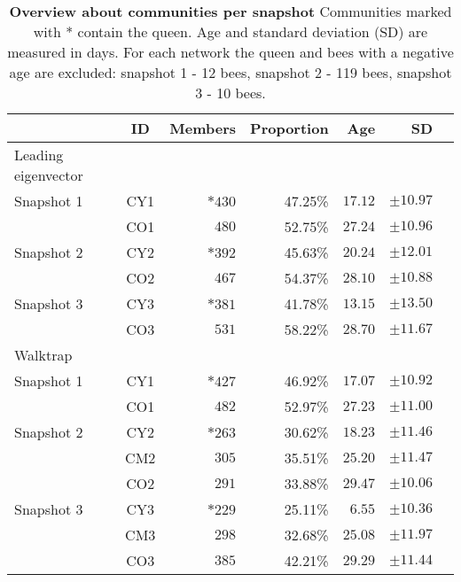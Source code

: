 \begin{table}
\small
\centering
\caption[Overview about communities]{\textbf{Overview about communities per snapshot} Communities marked with * contain the queen. Age and standard deviation (SD) are measured in days. For each network the queen and bees with a negative age are excluded: snapshot 1 - 12 bees, snapshot 2 - 119 bees, snapshot 3 - 10 bees.}
\label{tab:communities}
\vspace*{5mm}
\begin{tabular}{lcrrrrr}
	\toprule
	{}  & ID & Members & Proportion & Age & SD\\
	\midrule

	Leading eigenvector &&&&&\\
	\midrule 
	\quad Snapshot 1  & CY1 & $*430$  & 47.25\% & $17.12$ & $\pm10.97$ \\
	                 & CO1 & $480$   & 52.75\% & $27.24$ & $\pm10.96$ \\
	\midrule   							
	\quad Snapshot 2  & CY2 & $*392$  & 45.63\% & $20.24$ & $\pm12.01$ \\
	                 & CO2 & $467$   & 54.37\% & $28.10$ & $\pm10.88$ \\
	\midrule  
	\quad Snapshot 3  & CY3 & $*381$  & 41.78\% & $13.15$ & $\pm13.50$ \\
	                 & CO3 & $531$   & 58.22\% & $28.70$ & $\pm11.67$ \\
    \midrule

    Walktrap &&&&&\\
    \midrule 
	\quad Snapshot 1 & CY1 & $*427$ & 46.92\% & $17.07$ & $\pm10.92$\\
	                & CO1 & $482$  & 52.97\% & $27.23$ & $\pm11.00$\\
	\midrule
	\quad Snapshot 2 & CY2 & $*263$ & 30.62\% & $18.23$ & $\pm11.46$\\
				    & CM2 & $305$  & 35.51\% & $25.20$ & $\pm11.47$\\
				    & CO2 & $291$  & 33.88\% & $29.47$ & $\pm10.06$\\            
	\midrule
	\quad Snapshot 3 & CY3 & $*229$  & 25.11\% & $6.55$  & $\pm10.36$\\
					& CM3 & $298$  & 32.68\% & $25.08$ & $\pm11.97$\\
					& CO3 & $385$  & 42.21\% & $29.29$ & $\pm11.44$\\
	\bottomrule
\end{tabular}
\end{table}
